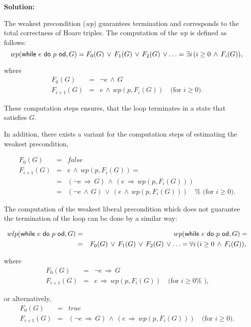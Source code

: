 \textbf{Solution:}\newline

The weakest precondition (\textit{wp}) guarantees termination and
corresponds to the total correctness of Hoare triples. The computation of
the \textit{wp} is defined as follows:%
\begin{equation*}
wp(\mbox{\sffamily while}\ e\ \mbox{\sffamily do}\ p\ \mbox{\sffamily od},G)=F_{0}(G)\,\vee \,F_{1}(G)\,\vee
\,F_{2}(G)\,\vee \ldots =\exists i\,(i\geq 0\,\wedge \,F_{i}(G)),\,
\end{equation*}

where%
\begin{eqnarray*}
F_{0}(G) &=&\lnot e\,\wedge \,G \\
F_{i+1}(G) &=&e\,\wedge \,wp(p,F_{i}(G))\quad \text{(for }i\geq 0\text{).}
\end{eqnarray*}

These computation steps ensures, that the loop terminates in a state that
satisfies $G$.

In addition, there exists a variant for the computation steps of estimating
the weakest precondition,

\begin{eqnarray*}
F_{0}(G) &=&false \\
F_{i+1}(G) &=&e\,\wedge \,wp(p,F_{i}(G))= \\
&=&(\lnot e\,\Rightarrow \,G)\,\wedge \,(e\,\Rightarrow \,wp(p,F_{i}(G))) \\
&=&(\lnot e\,\wedge \,G)\,\vee \,(e\,\wedge \,wp(p,F_{i}(G)))\quad \text{%
(for }i\geq 0\text{).}
\end{eqnarray*}

The computation of the weakest liberal precondition which does not guarantee
the termination of the loop can be done by a similar way:

\begin{eqnarray*}
wlp(\kw{while}\ e\ \kw{do}\ p\ \kw{od},G) &=&wp(\kw{while}\ e\ \kw{do}\ p\ %
\kw{od},G)= \\
&=&F_{0}(G)\,\vee \,F_{1}(G)\,\vee \,F_{2}(G)\,\vee \ldots =\forall
i\,(i\geq 0\,\wedge \,F_{i}(G)),\,
\end{eqnarray*}

where%
\begin{eqnarray*}
F_{0}(G) &=&\lnot e\,\Rightarrow \,G \\
F_{i+1}(G) &=&e\,\Rightarrow \,wp(p,F_{i}(G))\quad \text{(for }i\geq 0\text{%
),}
\end{eqnarray*}

or alternatively,
\begin{eqnarray}
F_{0}(G) &=&true  \label{wlp_step_1} \\
F_{i+1}(G) &=&(\lnot e\,\Rightarrow \,G)\,\wedge \,(e\,\Rightarrow
\,wp(p,F_{i}(G)))\quad \text{(for }i\geq 0\text{).}  \label{wlp_step_2}
\end{eqnarray}

